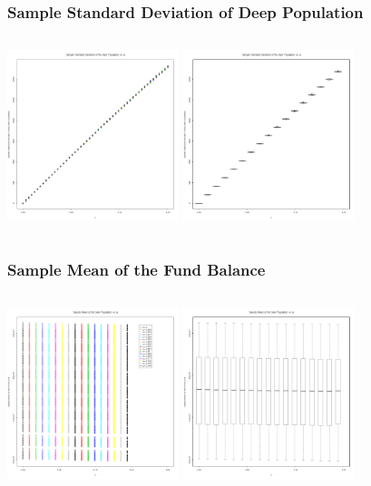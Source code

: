 \documentclass{beamer}   %
\begin{document}
\begin{frame}
  \frametitle{Sample Standard Deviation of Deep Population}
  \hspace*{-5mm}
  \begin{columns}
    \includegraphics[height=5cm]{stdDevDeerbyAlpha}
    \includegraphics[height=5cm]{stdDevDeerbyAlpha_boxplot}
  \end{columns}
\end{frame}



\begin{frame}
  \frametitle{Sample Mean of the Fund Balance }
  \hspace*{-5mm}
  \begin{columns}
    \includegraphics[height=5cm]{meanFundBalanceByAlpha}
    \includegraphics[height=5cm]{meanfundBalanceByAlpha_boxplot}
  \end{columns}
\end{frame}
\end{document}
